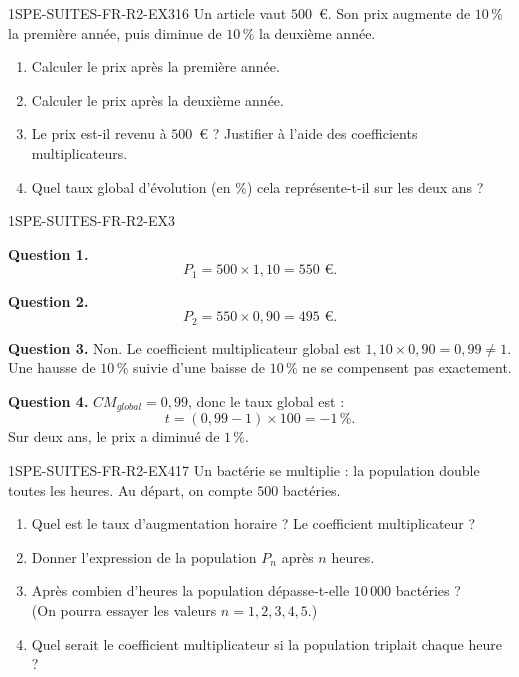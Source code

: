 
\begin{exercice}{1SPE-SUITES-FR-R2-EX3}{1}{6}
Un article vaut $500$~€. Son prix augmente de $10\,\%$ la première année, puis diminue de $10\,\%$ la deuxième année.
\begin{enumerate}
  \item Calculer le prix après la première année.
  \item Calculer le prix après la deuxième année.
  \item Le prix est-il revenu à $500$~€ ? Justifier à l'aide des coefficients multiplicateurs.
  \item Quel taux global d'évolution (en \%) cela représente-t-il sur les deux ans ?
\end{enumerate}
\end{exercice}


\begin{corrige}{1SPE-SUITES-FR-R2-EX3}

\textbf{Question 1.}
\[
P_1 = 500 \times 1{,}10 = 550 \text{ €.}
\]

\textbf{Question 2.}
\[
P_2 = 550 \times 0{,}90 = 495 \text{ €.}
\]


\textbf{Question 3.} Non. Le coefficient multiplicateur global est $1{,}10 \times 0{,}90 = 0{,}99 \neq 1$. Une hausse de $10\,\%$ suivie d'une baisse de $10\,\%$ ne se compensent pas exactement.

\textbf{Question 4.} $CM_{global} = 0{,}99$, donc le taux global est :
\[
t = (0{,}99 - 1) \times 100 = -1\,\%.
\]
Sur deux ans, le prix a diminué de $1\,\%$.

\end{corrige}


\begin{exercice}{1SPE-SUITES-FR-R2-EX4}{1}{7}
Un bactérie se multiplie : la population double toutes les heures. Au départ, on compte $500$ bactéries.
\begin{enumerate}
  \item Quel est le taux d'augmentation horaire ? Le coefficient multiplicateur ?
  \item Donner l'expression de la population $P_n$ après $n$ heures.
  \item Après combien d'heures la population dépasse-t-elle $10\,000$ bactéries ?\\
  (On pourra essayer les valeurs $n = 1, 2, 3, 4, 5$.)
  \item Quel serait le coefficient multiplicateur si la population triplait chaque heure ?
\end{enumerate}
\end{exercice}

